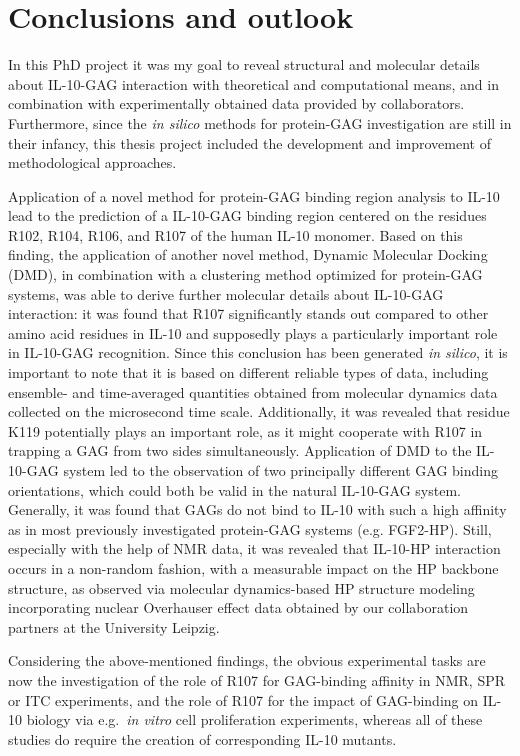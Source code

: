 \chapter{Conclusions and outlook}

In this PhD project it was my goal to reveal structural and molecular details
about IL-10-GAG interaction with theoretical and computational means, and in
combination with experimentally obtained data provided by collaborators.
Furthermore, since the \textit{in silico} methods for protein-GAG investigation
are still in their infancy, this thesis project included the development and
improvement of methodological approaches.

Application of a novel method for protein-GAG binding region analysis to IL-10
lead to the prediction of a IL-10-GAG binding region centered on the residues
R102, R104, R106, and R107 of the human IL-10 monomer. Based on this finding,
the application of another novel method, Dynamic Molecular Docking (DMD), in
combination with a clustering method optimized for protein-GAG systems, was able
to derive further molecular details about IL-10-GAG interaction: it was found
that R107 significantly stands out compared to other amino acid residues in
IL-10 and supposedly plays a particularly important role in IL-10-GAG
recognition. Since this conclusion has been generated \textit{in silico}, it is
important to note that it is based on different reliable types of data,
including ensemble- and time-averaged quantities obtained from molecular
dynamics data collected on the microsecond time scale. Additionally, it was
revealed that residue K119 potentially plays an important role, as it might
cooperate with R107 in trapping a GAG from two sides simultaneously. Application
of DMD to the IL-10-GAG system led to the observation of two principally
different GAG binding orientations, which could both be valid in the natural
IL-10-GAG system. Generally, it was found that GAGs do not bind to IL-10 with
such a high affinity as in most previously investigated protein-GAG systems
(e.g. FGF2-HP). Still, especially with the help of NMR data, it was revealed
that IL-10-HP interaction occurs in a non-random fashion, with a measurable
impact on the HP backbone structure, as observed via molecular dynamics-based HP
structure modeling incorporating nuclear Overhauser effect data obtained by our
collaboration partners at the University Leipzig.

Considering the above-mentioned findings, the obvious experimental tasks are now
the investigation of the role of R107 for GAG-binding affinity in NMR, SPR or
ITC experiments, and the role of R107 for the impact of GAG-binding on IL-10
biology via e.g.\ \textit{in vitro} cell proliferation experiments, whereas all
of these studies do require the creation of corresponding IL-10 mutants.

